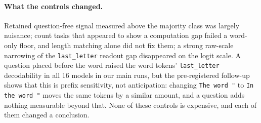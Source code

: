 \paragraph{What the controls changed.}
Retained question-free signal measured above the majority class was largely nuisance; count tasks
that appeared to show a computation gap failed a word-only floor, and length matching alone did not
fix them; a strong raw-scale narrowing of the \texttt{last\_letter} readout gap disappeared on the
logit scale. A question placed before the word raised the word tokens' \texttt{last\_letter}
decodability in all 16 models in our main runs, but the pre-registered follow-up shows that this is
prefix sensitivity, not anticipation: changing \texttt{The word "} to \texttt{In the word "} moves
the same tokens by a similar amount, and a question adds nothing measurable beyond that. None of
these controls is expensive, and each of them changed a conclusion.
